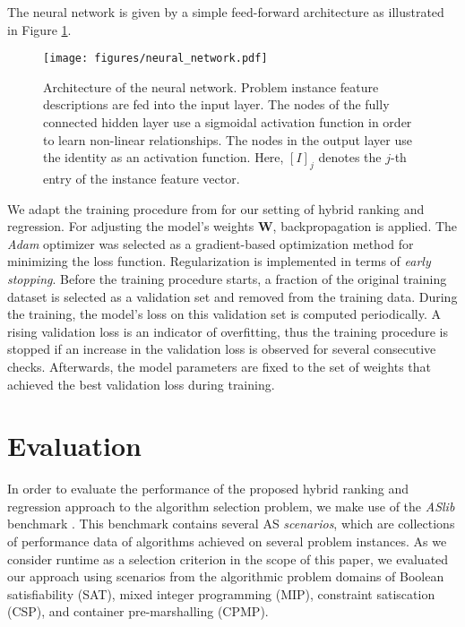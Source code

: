 \documentclass[runningheads]{llncs}
\begin{document}
The neural network is given by a simple feed-forward architecture as illustrated in Figure \ref{fig:neural_network}.
\begin{figure}  
    \centering
    \texttt{[image: figures/neural\_network.pdf]}
    \caption[Architecture of the neural network.]{Architecture of the neural network. Problem instance feature descriptions are fed into the input layer. The nodes of the fully connected hidden layer use a sigmoidal activation function in order to learn non-linear relationships. The nodes in the output layer use the identity as an activation function. Here, $[I]_j$ denotes the $j$-th entry of the instance feature vector.}
    \label{fig:neural_network}
\end{figure}
We adapt the training procedure from \cite{schafer_plackett-luce_2018} for our setting of hybrid ranking and regression. For adjusting the model's weights $\boldsymbol{W}$, backpropagation is applied.
The \textit{Adam} optimizer \cite{kingma_adam_2015} was selected as a gradient-based optimization method for minimizing the loss function. Regularization is implemented in terms of \textit{early stopping}. Before the training procedure starts, a fraction of the original training dataset is selected as a validation set and removed from the training data. During the training, the model's loss on this validation set is computed periodically. A rising validation loss is an indicator of overfitting, thus the training procedure is stopped if an increase in the validation loss is observed for several consecutive checks. Afterwards, the model parameters are fixed to the set of weights that achieved the best validation loss during training.


\section{Evaluation}
In order to evaluate the performance of the proposed hybrid ranking and regression approach to the algorithm selection problem, we make use of the \textit{ASlib} benchmark \cite{bischl_aslib:_2016}. This benchmark contains several AS \textit{scenarios}, which are collections of performance data of algorithms achieved on several problem instances. As we consider runtime as a selection criterion in the scope of this paper, we evaluated our approach using scenarios from the algorithmic problem domains of Boolean satisfiability (SAT), mixed integer programming (MIP), constraint satiscation (CSP), and container pre-marshalling (CPMP). 
\end{document}
